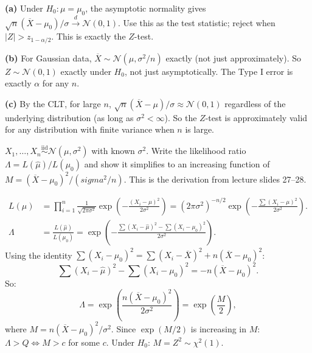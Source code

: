 \documentclass[11pt,a4paper]{article}
\newcommand{\iid}{\overset{\text{iid}}{\sim}}
\newcommand{\convd}{\xrightarrow{\,d\,}}
\newenvironment{solution}{%
  \begin{tcolorbox}[answerbox, title={Solution}]
}{%
  \end{tcolorbox}
}
\newcounter{quizq}
\newenvironment{quizquestion}[1]{%
  \refstepcounter{quizq}%
  \begin{tcolorbox}[quizbox, title={Quiz Question \thequizq\ --- #1}]
}{%
  \end{tcolorbox}
}
\begin{document}
\begin{solution}
\textbf{(a)} Under $H_0:\mu=\mu_0$, the asymptotic normality gives $\sqrt{n}(\overline{X}-\mu_0)/\sigma\convd\mathcal{N}(0,1)$. Use this as the test statistic; reject when $|Z|>z_{1-\alpha/2}$. This is exactly the $Z$-test.

\textbf{(b)} For Gaussian data, $\overline{X}\sim\mathcal{N}(\mu,\sigma^2/n)$ exactly (not just approximately). So $Z\sim\mathcal{N}(0,1)$ exactly under $H_0$, not just asymptotically. The Type I error is exactly $\alpha$ for any $n$.

\textbf{(c)} By the CLT, for large $n$, $\sqrt{n}(\overline{X}-\mu)/\sigma\approx\mathcal{N}(0,1)$ regardless of the underlying distribution (as long as $\sigma^2<\infty$). So the $Z$-test is approximately valid for any distribution with finite variance when $n$ is large.
\end{solution}

\begin{quizquestion}{Likelihood ratio for Gaussian (bilateral)}
$X_1,\ldots,X_n\iid\mathcal{N}(\mu,\sigma^2)$ with known $\sigma^2$. Write the likelihood ratio $\Lambda=L(\hat\mu)/L(\mu_0)$ and show it simplifies to an increasing function of $M=(\overline{X}-\mu_0)^2/(sigma^2/n)$. This is the derivation from lecture slides 27--28.
\end{quizquestion}

\begin{solution}
\begin{align*}
  L(\mu) &= \prod_{i=1}^n \frac{1}{\sqrt{2\pi\sigma^2}}\exp\!\left(-\frac{(X_i-\mu)^2}{2\sigma^2}\right)
  = (2\pi\sigma^2)^{-n/2}\exp\!\left(-\frac{\sum(X_i-\mu)^2}{2\sigma^2}\right).\\
  \Lambda &= \frac{L(\hat\mu)}{L(\mu_0)}
  = \exp\!\left(-\frac{\sum(X_i-\hat\mu)^2-\sum(X_i-\mu_0)^2}{2\sigma^2}\right).
\end{align*}
Using the identity $\sum(X_i-\mu_0)^2=\sum(X_i-\overline{X})^2+n(\overline{X}-\mu_0)^2$:
\[
  \sum(X_i-\hat\mu)^2-\sum(X_i-\mu_0)^2 = -n(\overline{X}-\mu_0)^2.
\]
So:
\[
  \Lambda = \exp\!\left(\frac{n(\overline{X}-\mu_0)^2}{2\sigma^2}\right) = \exp\!\left(\frac{M}{2}\right),
\]
where $M=n(\overline{X}-\mu_0)^2/\sigma^2$. Since $\exp(M/2)$ is increasing in $M$: $\Lambda>Q\iff M>c$ for some $c$. Under $H_0$: $M=Z^2\sim\chi^2(1)$. \checkmark
\end{solution}
\end{document}
